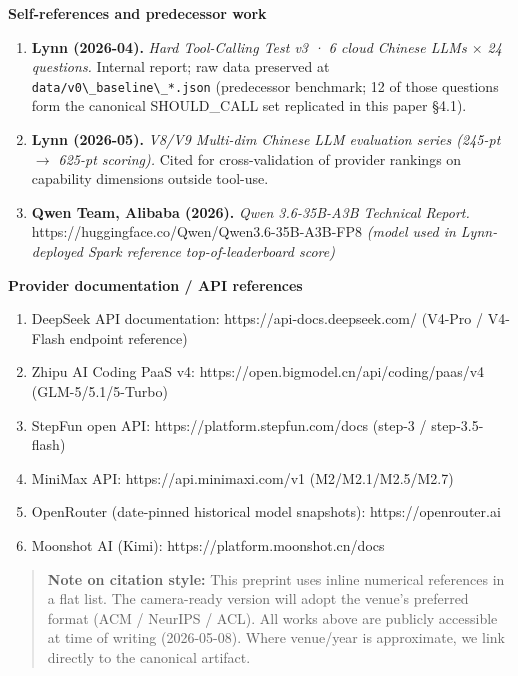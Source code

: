 \documentclass[11pt]{article}
\providecommand{\tightlist}{\setlength{\itemsep}{0pt}\setlength{\parskip}{0pt}}
\providecommand{\passthrough}[1]{#1}
\begin{document}
\textbf{Self-references and predecessor work}

\begin{enumerate}
\def\labelenumi{\arabic{enumi}.}
\setcounter{enumi}{16}
\tightlist
\item
  \textbf{Lynn (2026-04).} \emph{Hard Tool-Calling Test v3 · 6 cloud
  Chinese LLMs $\times$ 24 questions.} Internal report; raw data preserved at
  \passthrough{\lstinline!data/v0\_baseline\_*.json!} (predecessor
  benchmark; 12 of those questions form the canonical SHOULD\_CALL set
  replicated in this paper §4.1).
\item
  \textbf{Lynn (2026-05).} \emph{V8/V9 Multi-dim Chinese LLM evaluation
  series (245-pt $\rightarrow$ 625-pt scoring).} Cited for cross-validation of
  provider rankings on capability dimensions outside tool-use.
\item
  \textbf{Qwen Team, Alibaba (2026).} \emph{Qwen 3.6-35B-A3B Technical
  Report.} https://huggingface.co/Qwen/Qwen3.6-35B-A3B-FP8 \emph{(model
  used in Lynn-deployed Spark reference top-of-leaderboard score)}
\end{enumerate}

\textbf{Provider documentation / API references}

\begin{enumerate}
\def\labelenumi{\arabic{enumi}.}
\setcounter{enumi}{19}
\tightlist
\item
  DeepSeek API documentation: https://api-docs.deepseek.com/ (V4-Pro /
  V4-Flash endpoint reference)
\item
  Zhipu AI Coding PaaS v4: https://open.bigmodel.cn/api/coding/paas/v4
  (GLM-5/5.1/5-Turbo)
\item
  StepFun open API: https://platform.stepfun.com/docs (step-3 /
  step-3.5-flash)
\item
  MiniMax API: https://api.minimaxi.com/v1 (M2/M2.1/M2.5/M2.7)
\item
  OpenRouter (date-pinned historical model snapshots):
  https://openrouter.ai
\item
  Moonshot AI (Kimi): https://platform.moonshot.cn/docs
\end{enumerate}

\begin{quote}
\textbf{Note on citation style:} This preprint uses inline numerical
references in a flat list. The camera-ready version will adopt the
venue's preferred format (ACM / NeurIPS / ACL). All works above are
publicly accessible at time of writing (2026-05-08). Where venue/year is
approximate, we link directly to the canonical artifact.
\end{quote}
\end{document}
